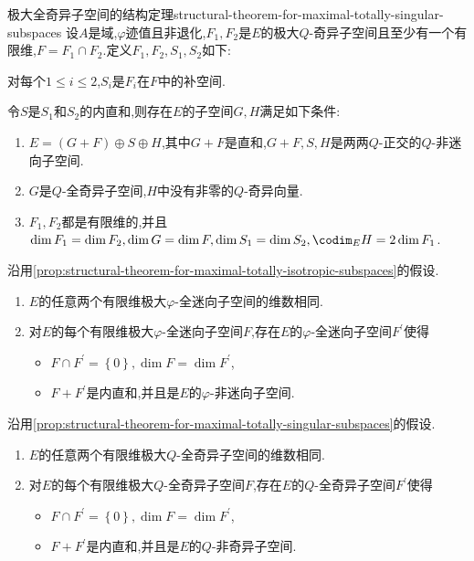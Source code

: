 \begin{proposition}{极大全奇异子空间的结构定理}{structural-theorem-for-maximal-totally-singular-subspaces}
	设$A$是域,$\varphi$迹值且非退化,$F_{1},F_{2}$是$E$的极大$Q$-奇异子空间且至少有一个有限维,$F=F_{1}\cap F_{2}$.定义$F_{1},F_{2},S_{1},S_{2}$如下:
	\begin{center}
		对每个$1\leq i\leq 2$,$S_{i}$是$F_{i}$在$F$中的补空间.
	\end{center}
	令$S$是$S_{1}$和$S_{2}$的内直和,则存在$E$的子空间$G,H$满足如下条件:
	\begin{enumerate}
		\item $E=\left(G+F\right)\oplus S\oplus H$,其中$G+F$是直和,$G+F,S,H$是两两$Q$-正交的$Q$-非迷向子空间.
		\item $G$是$Q$-全奇异子空间,$H$中没有非零的$Q$-奇异向量.
		\item $F_{1},F_{2}$都是有限维的,并且$\dim F_{1}=\dim F_{2},\dim G=\dim F,\dim S_{1}=\dim S_{2},\codim_{E}H=2\dim F_{1}$.
	\end{enumerate}
\end{proposition}

\begin{corollary}{}{}
	沿用\cref{prop:structural-theorem-for-maximal-totally-isotropic-subspaces}的假设.
	\begin{enumerate}
		\item $E$的任意两个有限维极大$\varphi$-全迷向子空间的维数相同.
		\item 对$E$的每个有限维极大$\varphi$-全迷向子空间$F$,存在$E$的$\varphi$-全迷向子空间$F^{\prime}$使得
		\begin{itemize}
			\item $F\cap F^{\prime}=\left\{0\right\},\dim F=\dim F^{\prime}$,
			\item $F+F^{\prime}$是内直和,并且是$E$的$\varphi$-非迷向子空间.
		\end{itemize}
	\end{enumerate}
\end{corollary}

\begin{corollary}{}{}
	沿用\cref{prop:structural-theorem-for-maximal-totally-singular-subspaces}的假设.
	\begin{enumerate}
		\item $E$的任意两个有限维极大$Q$-全奇异子空间的维数相同.
		\item 对$E$的每个有限维极大$Q$-全奇异子空间$F$,存在$E$的$Q$-全奇异子空间$F^{\prime}$使得
		\begin{itemize}
			\item $F\cap F^{\prime}=\left\{0\right\},\dim F=\dim F^{\prime}$,
			\item $F+F^{\prime}$是内直和,并且是$E$的$Q$-非奇异子空间.
		\end{itemize}
	\end{enumerate}
\end{corollary}

